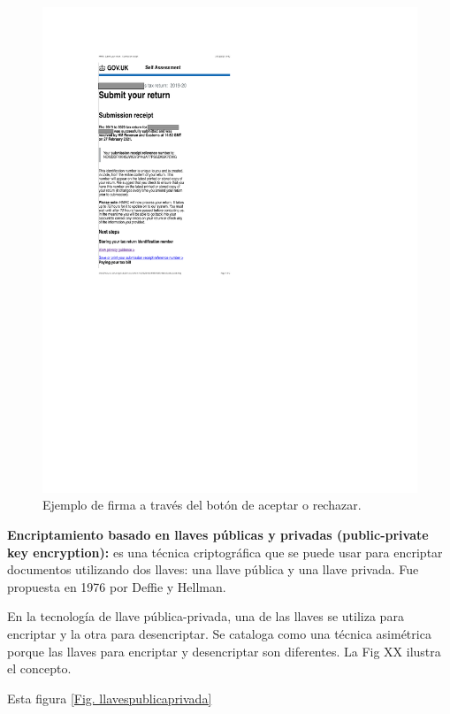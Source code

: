 \documentclass[12pt]{report} %
\begin{document}
\begin{itemize}
\begin{figure}
\centering
\includegraphics[width=0.85\columnwidth]{imagenes/firmaclickwrap.pdf}
\caption{Ejemplo de firma a través del botón de aceptar o rechazar.}
\label{Fig. Firmaclickwrap}
\end{figure} 

\textbf{Encriptamiento basado en llaves públicas y privadas (public-private key encryption):} es una técnica criptográfica que se puede usar para encriptar documentos utilizando dos llaves: una llave pública y una llave privada. Fue propuesta en 1976 por Deffie y Hellman.

En la tecnología de llave pública-privada, una de las llaves se utiliza para encriptar y la otra para desencriptar. Se cataloga como una técnica asimétrica porque las llaves para encriptar y desencriptar son diferentes. La Fig XX ilustra el concepto.

Esta figura \ref{Fig. llavespublicaprivada}


\end{itemize}
\end{document}
